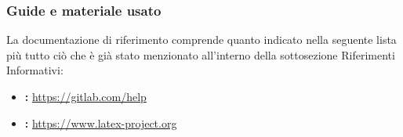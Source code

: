 \subsubsection{Guide e materiale usato}
La documentazione di riferimento comprende quanto indicato nella seguente lista più tutto ciò che è già stato menzionato all’interno della sottosezione Riferimenti Informativi:
\begin{itemize}
    \item \textbf{: }\href{https://gitlab.com/help}{https://gitlab.com/help}
    \item \textbf{: }\href{https://www.latex-project.org}{https://www.latex-project.org}
\end{itemize}
